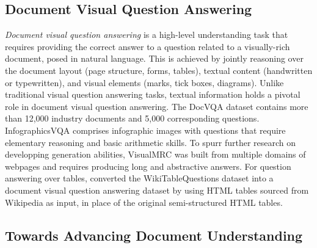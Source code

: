\subsection{Document Visual Question Answering}


\textit{Document visual question answering} is a high-level understanding task that requires providing the correct answer to a question related to a visually-rich document, posed in natural language. This is achieved by jointly reasoning over the document layout (page structure, forms, tables), textual content (handwritten or typewritten), and visual elements (marks, tick boxes, diagrams). Unlike traditional visual question answering tasks, textual information holds a pivotal role in document visual question answering. The DocVQA dataset \citep{mathew2021docvqa} contains more than 12,000 industry documents and 5,000 corresponding questions. InfographicsVQA \citep{mathew2022infographicvqa} comprises infographic images with questions that require elementary reasoning and basic arithmetic skills. To spurr further research on developping generation abilities, VisualMRC \citep{tanaka2021visualmrc} was built from multiple domains of webpages and requires producing long and abstractive answers. For question answering over tables, \citet{borchmann2021due} converted the WikiTableQuestions dataset \citep{pasupat2015compositional} into a document visual question answering dataset by using HTML tables sourced from Wikipedia as input, in place of the original semi-structured HTML tables. \\


\subsection{Towards Advancing Document Understanding}

